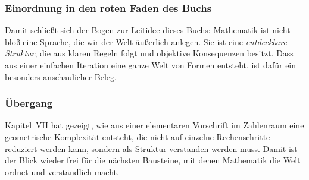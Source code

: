 \subsubsection*{Einordnung in den roten Faden des Buchs}

Damit schließt sich der Bogen zur Leitidee dieses Buchs:
Mathematik ist nicht bloß eine Sprache,
die wir der Welt äußerlich anlegen.
Sie ist eine \emph{entdeckbare Struktur},
die aus klaren Regeln folgt
und objektive Konsequenzen besitzt.
Dass aus einer einfachen Iteration
eine ganze Welt von Formen entsteht,
ist dafür ein besonders anschaulicher Beleg.

\subsubsection*{Übergang}

Kapitel~VII hat gezeigt,
wie aus einer elementaren Vorschrift im Zahlenraum
eine geometrische Komplexität entsteht,
die nicht auf einzelne Rechenschritte reduziert werden kann,
sondern als Struktur verstanden werden muss.
Damit ist der Blick wieder frei
für die nächsten Bausteine,
mit denen Mathematik die Welt ordnet und verständlich macht.